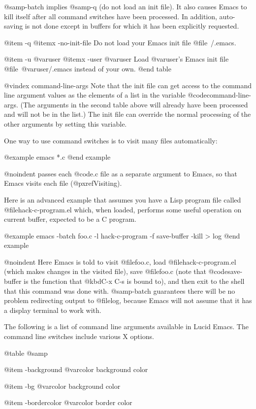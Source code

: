 {{{@samp{-batch} implies @samp{-q} (do not load an init file).  It also causes
Emacs to kill itself after all command switches have been processed.  In
addition, auto-saving is not done except in buffers for which it has been
explicitly requested.

@item -q
@itemx -no-init-file
Do not load your Emacs init file @file{~/.emacs}.

@item -u @var{user}
@itemx -user @var{user}
Load @var{user}'s Emacs init file @file{~@var{user}/.emacs} instead of
your own.
@end table

@vindex command-line-args
  Note that the init file can get access to the command line argument
values as the elements of a list in the variable @code{command-line-args}.
(The arguments in the second table above will already have been processed
and will not be in the list.)  The init file can override the normal
processing of the other arguments by setting this variable.

  One way to use command switches is to visit many files automatically:

@example
emacs *.c
@end example

@noindent
passes each @code{.c} file as a separate argument to Emacs, so that Emacs
visits each file (@pxref{Visiting}).

  Here is an advanced example that assumes you have a Lisp program
file called @file{hack-c-program.el} which, when loaded, performs some
useful operation on current buffer, expected to be a C program.

@example
emacs -batch foo.c -l hack-c-program -f save-buffer -kill > log
@end example

@noindent
Here Emacs is told to visit @file{foo.c}, load @file{hack-c-program.el}
(which makes changes in the visited file), save @file{foo.c} (note that
@code{save-buffer} is the function that @kbd{C-x C-s} is bound to), and
then exit to the shell that this command was done with.  @samp{-batch}
guarantees there will be no problem redirecting output to @file{log},
because Emacs will not assume that it has a display terminal to work with.

The following is a list of command line arguments available in Lucid Emacs.  
The command line switches include various X options.

@table @samp

@item -background @var{color}
background color

@item -bg @var{color}
background color

@item -bordercolor @var{color}
border color

}}}
